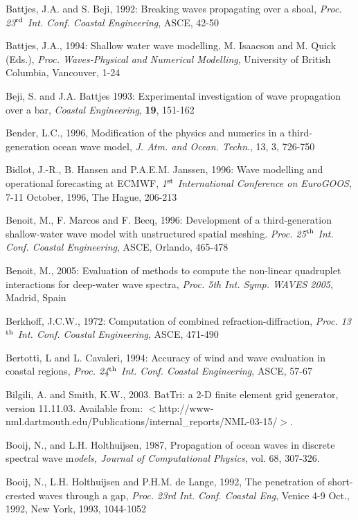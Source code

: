 \documentclass[12pt]{book}
\begin{document}
\begin{thebibliography}{10}
Battjes, J.A. and S. Beji, 1992: Breaking waves propagating over a shoal, {\it Proc. 23$^{{\rm rd}}$ Int. Conf. Coastal
Engineering}, ASCE, 42-50

Battjes, J.A., 1994: Shallow water wave modelling, M. Isaacson and M. Quick (Eds.), {\it Proc. Waves-Physical
and Numerical Modelling}, University of British Columbia, Vancouver, 1-24

Beji, S. and J.A. Battjes 1993: Experimental investigation of wave propagation over a bar, {\it Coastal
Engineering}, {\bf 19}, 151-162

Bender, L.C., 1996, Modification of the physics and numerics in a third-generation ocean wave model, {\it J.
Atm. and Ocean. Techn}., 13, 3, 726-750

Bidlot, J.-R., B. Hansen and P.A.E.M. Janssen, 1996: Wave modelling and operational forecasting at
ECMWF, {\it 1$^{{\rm st}}$ International Conference on EuroGOOS}, 7-11 October, 1996, The Hague, 206-213

Benoit, M., F. Marcos and F. Becq, 1996: Development of a third-generation shallow-water wave model
with unstructured spatial meshing. {\it Proc. 25$^{{\rm th}}$ Int. Conf. Coastal Engineering}, ASCE, Orlando,
465-478

Benoit, M., 2005: Evaluation of methods to compute the non-linear quadruplet interactions for deep-water wave spectra,
{\it Proc. 5th Int. Symp. WAVES 2005}, Madrid, Spain

Berkhoff, J.C.W., 1972: Computation of combined refraction-diffraction, {\it Proc. 13$^{{\rm th}}$ Int. Conf. Coastal
Engineering}, ASCE, 471-490

Bertotti, L and L. Cavaleri, 1994: Accuracy of wind and wave evaluation in coastal regions, {\it Proc. 24$^{{\rm th}}$ Int.
Conf. Coastal Engineering}, ASCE, 57-67

Bilgili, A. and Smith, K.W., 2003.
BatTri: a 2-D finite element grid generator, version 11.11.03.
Available from: $<$http://www-nml.dartmouth.edu/Publications/internal\_reports/NML-03-15/$>$.

Booij, N., and L.H. Holthuijsen, 1987, Propagation of ocean waves in discrete spectral wave m{\it odels,
Journal of Computational Physics}, vol. 68, 307-326.

Booij, N., L.H. Holthuijsen and P.H.M. de Lange, 1992, The penetration of short-crested waves through
a gap, {\it Proc. 23rd Int. Conf. Coastal Eng}, Venice 4-9 Oct., 1992, New York, 1993, 1044-1052


\end{thebibliography}
\end{document}
